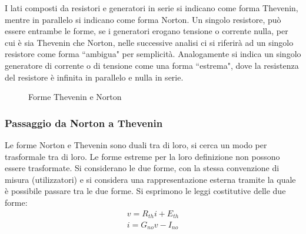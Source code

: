 \documentclass{article}
\numberwithin{equation}{subsection}
\begin{document}
I lati composti da resistori e generatori in serie si indicano come forma Thevenin, mentre in parallelo si indicano come forma Norton. Un singolo resistore, può essere 
entrambe le forme, se i generatori erogano tensione o corrente nulla, per cui è sia Thevenin che Norton, nelle successive analisi ci si riferirà ad un singolo resistore come 
forma ``ambigua" per semplicità. Analogamente si indica un singolo generatore di corrente o di tensione come una forma ``estrema", dove la resistenza del resistore è infinita in 
parallelo e nulla in serie. 

\begin{figure}[H]%
    \centering
    \qquad
    \caption{Forme Thevenin e Norton}
    \label{fig:forme-thevenin-norton}
\end{figure}



\subsubsection{Passaggio da Norton a Thevenin}

Le forme Norton e Thevenin sono duali tra di loro, si cerca un modo per trasformale tra di loro. Le forme estreme per la loro definizione non possono essere trasformate. 
Si considerano le due forme, con la stessa convenzione di misura (utilizzatori) e si considera una rappresentazione esterna tramite la quale è possibile passare tra le due 
forme. 
Si esprimono le leggi costitutive delle due forme:
\begin{gather*}
    v=R_{th}i+E_{th}\\
    i=G_{no}v-I_{no}
\end{gather*}
\end{document}
